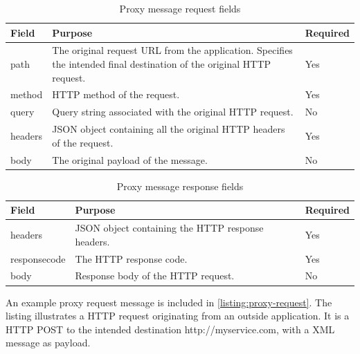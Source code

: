 \begin{table}[h]
\begin{tabularx}{\textwidth}{|l|X|l|}
\hline
\textbf{Field} & \textbf{Purpose}                                                                                                      & \textbf{Required} \\ \hline
path           & The original request URL from the application. Specifies the intended final destination of the original HTTP request. & Yes               \\ \hline
method         & HTTP method of the request.                                                                                           & Yes               \\ \hline
query          & Query string associated with the original HTTP request.                                                               & No                \\ \hline
headers        & JSON object containing all the original HTTP headers of the request.                                                   & Yes               \\ \hline
body           & The original payload of the message.                                                                                   & No                \\ \hline
\end{tabularx}
\caption{Proxy message request fields}
\label{table-proxy-request}
\end{table}

\begin{table}[h]
\begin{tabularx}{\textwidth}{|l|X|l|}
\hline
\textbf{Field} & \textbf{Purpose}   & \textbf{Required} \\ \hline
headers        & JSON object containing the HTTP response headers. & Yes  \\ \hline
responsecode   & The HTTP response code. & Yes \\ \hline
body           & Response body of the HTTP request. & No            \\ \hline
\end{tabularx}
\caption{Proxy message response fields}
\label{table-proxy-response}

\end{table}

An example proxy request message is included in \cref{listing:proxy-request}.
The listing illustrates a HTTP request originating from an outside application.
It is a HTTP POST to the intended destination http://myservice.com, with a XML
message as payload.

